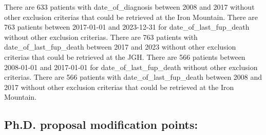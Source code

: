 \documentclass{article}%
\begin{document}
\newline%
\newline%
%
There are 633 patients with date\_of\_diagnosis between 2008 and 2017 without other exclusion criterias that could be retrieved at the Iron Mountain.%
\newline%
\newline%
%
There are 763 patients between 2017{-}01{-}01 and 2023{-}12{-}31 for date\_of\_last\_fup\_death without other exclusion criterias.%
\newline%
\newline%
%
There are 763 patients with date\_of\_last\_fup\_death between 2017 and 2023 without other exclusion criterias that could be retrieved at the JGH.%
\newline%
\newline%
%
There are 566 patients between 2008{-}01{-}01 and 2017{-}01{-}01 for date\_of\_last\_fup\_death without other exclusion criterias.%
\newline%
\newline%
%
There are 566 patients with date\_of\_last\_fup\_death between 2008 and 2017 without other exclusion criterias that could be retrieved at the Iron Mountain.%
\newline%
\newline%
%
%
\newline%
\newline%
%
\subsection{Ph.D. proposal modification points: }%
\label{subsec:Ph.D.proposalmodificationpoints}%
\end{document}
